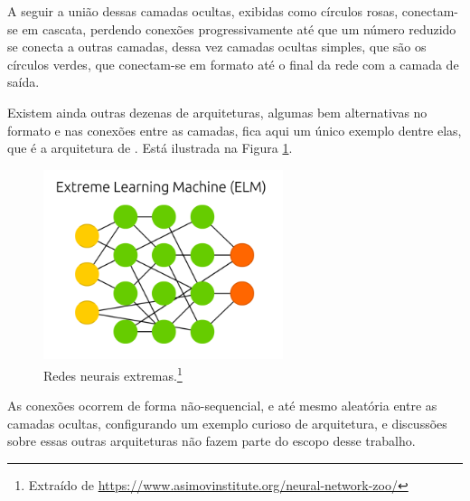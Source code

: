 A seguir a união dessas camadas ocultas, exibidas como círculos rosas, conectam-se em cascata, perdendo conexões progressivamente até que um número reduzido se conecta a outras camadas, dessa vez camadas ocultas simples, que são os círculos verdes, que conectam-se em formato  até o final da rede com a camada de saída. 

Existem ainda outras dezenas de arquiteturas, algumas bem alternativas no formato e nas conexões entre as camadas, fica aqui um único exemplo dentre elas, que é a arquitetura de . Está ilustrada na Figura \ref{fig:estrutura_e}.

\begin{figure}[htb]
\centering
\includegraphics[width=7cm]{figuras/estrutura_e}
\caption{Redes neurais extremas.\footnote{Extraído de \url{https://www.asimovinstitute.org/neural-network-zoo/}}}
\label{fig:estrutura_e}
\end{figure}

As conexões ocorrem de forma não-sequencial, e até mesmo aleatória entre as camadas ocultas, configurando um exemplo curioso de arquitetura, e discussões sobre essas outras arquiteturas não fazem parte do escopo desse trabalho.